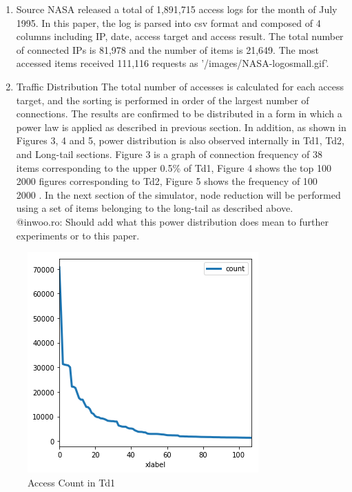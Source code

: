 \documentclass[sigconf,anonymous=false]{acmart}
\begin{document}
\begin{enumerate}
\item Source
\newline NASA released a total of 1,891,715 access logs for the month of July 1995. In this paper, the log is parsed into csv format and composed of 4 columns including IP, date, access target and access result.
The total number of connected IPs is 81,978 and the number of items is 21,649. The most accessed items received 111,116 requests as '/images/NASA-logosmall.gif'.
\newline
\item Traffic Distribution
\newline 
The total number of accesses is calculated for each access target, and the sorting is performed in order of the largest number of connections. The results are confirmed to be distributed in a form in which a power law is applied as described in previous section. 
In addition, as shown in Figures 3, 4 and 5, power distribution is also observed internally in Td1, Td2, and Long-tail sections. Figure 3 is a graph of connection frequency of 38 items corresponding to the upper 0.5\% of Td1, Figure 4 shows the top 100 ~ 2000 figures corresponding to Td2, Figure 5 shows the frequency of 100 ~ 2000 . In the next section of the simulator, node reduction will be performed using a set of items belonging to the long-tail as described above. \\
@inwoo.ro: Should add what this power distribution does mean to further experiments or to this paper.
\end{enumerate}

\begin{figure}[H]
    \centering
    \includegraphics[width=0.85\columnwidth]{figs/figure_02_td1.png}
    \caption{Access Count in Td1}
    \label{fig:my_label}
\end{figure}
\end{document}
